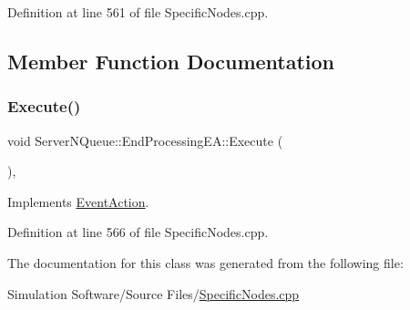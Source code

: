 Definition at line 561 of file Specific\+Nodes.\+cpp.



\subsection{Member Function Documentation}
\mbox{\label{class_server_n_queue_1_1_end_processing_e_a_a58033da71d12b3d61bf4c48f7c470e3d}} 
\subsubsection{\texorpdfstring{Execute()}{Execute()}}
{\footnotesize\ttfamily void Server\+N\+Queue\+::\+End\+Processing\+E\+A\+::\+Execute (\begin{DoxyParamCaption}{ }\end{DoxyParamCaption})\hspace{0.3cm}{\ttfamily [inline]}, {\ttfamily [virtual]}}



Implements \hyperlink{class_event_action_a62b9d07abb4ca8e7c078b076a1ab1a9f}{Event\+Action}.



Definition at line 566 of file Specific\+Nodes.\+cpp.



The documentation for this class was generated from the following file\+:\begin{DoxyCompactItemize}
\item 
Simulation Software/\+Source Files/\hyperlink{_specific_nodes_8cpp}{Specific\+Nodes.\+cpp}\end{DoxyCompactItemize}
